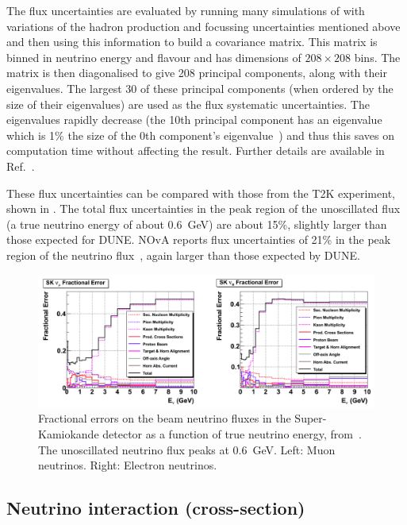 The flux uncertainties are evaluated by running many simulations of with variations of the hadron production and focussing uncertainties mentioned above and then using this information to build a covariance matrix.
This matrix is binned in neutrino energy and flavour and has dimensions of $208 \times 208$ bins.
The matrix is then diagonalised to give 208 principal components, along with their eigenvalues.
The largest 30 of these principal components (when ordered by the size of their eigenvalues) are used as the flux systematic uncertainties.
The eigenvalues rapidly decrease (the 10th principal component has an eigenvalue which is 1\% the size of the 0th component's eigenvalue~\cite{tdrVol2}) and thus this saves on computation time without affecting the result. 
Further details are available in Ref.~\cite{duneFluxUncertainties}.

These flux uncertainties can be compared with those from the T2K experiment, shown in .
The total flux uncertainties in the peak region of the unoscillated flux (a true neutrino energy of about \SI{0.6}{\GeV}) are about 15\%, slightly larger than those expected for DUNE.
NOvA reports flux uncertainties of 21\% in the peak region of the neutrino flux~\cite{novaFluxUnc}, again larger than those expected by DUNE.

\begin{figure}[h]
  \centering
  \includegraphics[width=.9\linewidth]{files/figures/dune_lbl/t2kFluxUncertainties}
  \caption[Fractional errors on beam neutrino fluxes in Super-Kamiokande]{Fractional errors on the beam neutrino fluxes in the Super-Kamiokande detector as a function of true neutrino energy, from~\cite{t2kFluxUnc}. The unoscillated neutrino flux peaks at \SI{0.6}{\GeV}. Left: Muon neutrinos. Right: Electron neutrinos.}
  \label{fig:t2kFluxUnc}
\end{figure}


\subsection{Neutrino interaction (cross-section)}
\label{sec:dune_lbl:systs:xsec}

